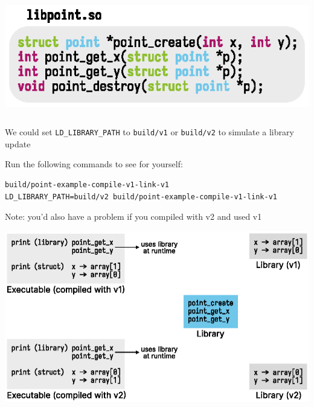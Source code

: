   \begin{slide}
    

    \includegraphics{point-api.eps}

  \end{slide}

  \begin{slide}

    
    \inputminted{c}{point-example.c}

  \end{slide}

  \begin{slide}


    We could set \texttt{LD\_LIBRARY\_PATH} to \texttt{build/v1} or \texttt{build/v2}
    to simulate a library update
    \bigskip

    Run the following commands to see for yourself:
    \begin{verbatim}
build/point-example-compile-v1-link-v1
LD_LIBRARY_PATH=build/v2 build/point-example-compile-v1-link-v1
    \end{verbatim}
    \medskip

    Note: you'd also have a problem if you compiled with v2 and used v1
  \end{slide}

  \begin{slide}
    
  
    \includegraphics{point-libraries.eps}

  \end{slide}

